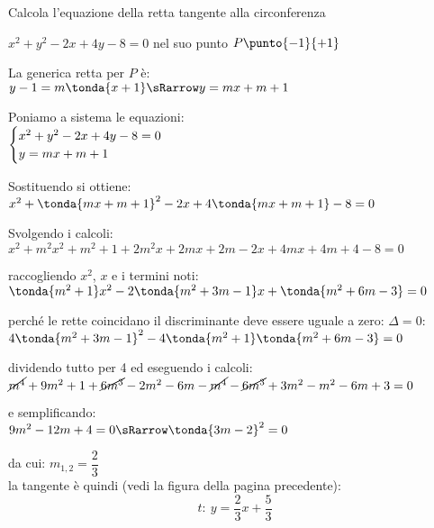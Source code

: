 \begin{esempio}
Calcola l'equazione della retta tangente alla circonferenza 

\(x^2 +y^2 -2x +4y -8 = 0\) nel suo punto \(P \punto{-1}{+1}\) 

La generica retta per \(P\) è: \\
\(y -1 = m \tonda{x +1} \sRarrow y = mx +m +1\)

Poniamo a sistema le equazioni: \\  
\(\begin{cases}x^2 + y^2 -2x +4y -8 = 0 \\ y = mx +m +1\end{cases}\) 

Sostituendo si ottiene: \\    
\(x^2 + \tonda{mx +m +1}^2 -2x +4\tonda{mx +m +1} -8 = 0\) 

Svolgendo i calcoli: \\    
\(x^2 + m^2x^2 +m^2 +1 +2m^2x +2mx +2m -2x +4mx +4m +4 -8 = 0\) 

raccogliendo \(x^2\), \(x\) e i termini noti: \\    
\(\tonda{m^2+1}x^2 -2\tonda{m^2 +3m -1}x +\tonda{m^2 +6m -3} = 0\) 

perché le rette coincidano il discriminante deve essere 
uguale a zero: \(\Delta = 0\): \\ 
\(4\tonda{m^2 +3m -1}^2 -4 \tonda{m^2 +1}\tonda{m^2 +6m -3} = 0\) 

dividendo tutto per 4 ed eseguendo i calcoli: \\ 
\(\cancel{m^4} +9m^2 +1 +\cancel{6m^3} -2m^2 -6m -
\cancel{m^4} -\cancel{6m^3} +3m^2 -m^2 -6m +3 = 0\) 

e semplificando: \\ 
\(9m^2 -12m +4 = 0 \sRarrow \tonda{3m -2}^2 = 0\) 

da cui: \(m_{1,2} = \dfrac{2}{3} \)\\
la tangente è quindi (vedi la figura della pagina precedente):
\[t:~y = \dfrac{2}{3}x +\dfrac{5}{3}\]
\end{esempio}

